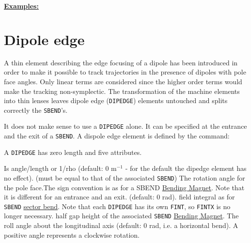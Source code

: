 {\bf \underline {Examples:}}



\section{Dipole edge}
\label{sec:dipedge}

A thin element describing the edge focusing of a dipole has been
introduced in order to make it possible to track trajectories in the
presence of dipoles with pole face angles. Only linear terms are
considered since the higher order terms would make the tracking
non-symplectic. The transformation of the machine elements into thin
lenses leaves dipole edge ({\tt DIPEDGE}) elements untouched and splits 
correctly the {\tt SBEND}'s.  

It does not make sense to use a {\tt DIPEDGE} alone. 
It can be specified at the entrance and the exit of a {\tt SBEND}. 
A dispole edge element is defined by the command:  

A {\tt DIPEDGE} has zero length and five attributes. 
\begin{madlist}
    Is angle/length or 1/rho (default: 0 m$^{-1}$ - for the
     default the dipedge element has no effect). (must be equal to that
     of the associated {\tt SBEND})  
    The rotation angle for the pole face.The sign convention is
     as for a SBEND \href{bend.html}{Bending Magnet}. Note that it is
     different for an entrance and an exit. (default: 0 rad).  
    field integral as for {\tt SBEND}
     \href{local_system.html#sbend}{sector bend}. Note that each {\tt DIPEDGE}
     has its own {\tt FINT}, so {\tt FINTX} is no longer necessary.  
    half gap height of the associated {\tt SBEND}
     \hyperref[sec:sbend]{Bending Magnet}.   
    The roll angle about the longitudinal axis (default: 0
     rad, i.e. a horizontal bend). A positive angle represents a
     clockwise rotation.  
\end{madlist}



